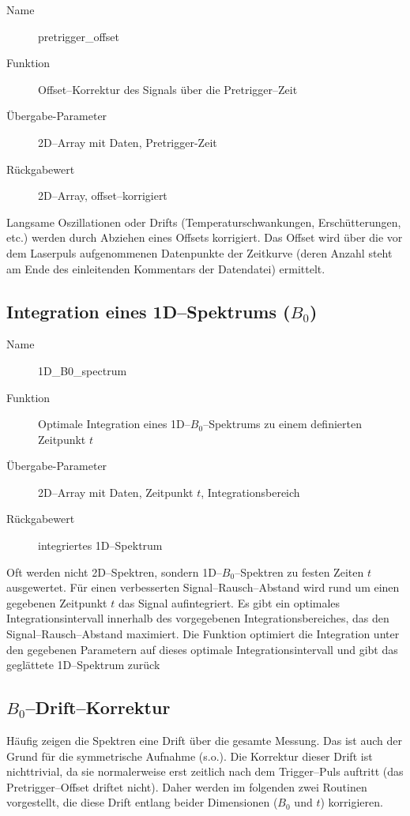 \documentclass{article}
\begin{document}
\begin{description}
  \item[Name] pretrigger\_offset
  \item[Funktion] Offset--Korrektur des Signals über die Pretrigger--Zeit
  \item[Übergabe-Parameter] 2D--Array mit Daten, Pretrigger-Zeit
  \item[Rückgabewert] 2D--Array, offset--korrigiert
\end{description}

Langsame Oszillationen oder Drifts (Temperaturschwankungen, Erschütterungen, 
etc.) werden durch Abziehen eines Offsets korrigiert. Das Offset wird über die 
vor dem Laserpuls aufgenommenen Datenpunkte der Zeitkurve (deren Anzahl steht 
am Ende des einleitenden Kommentars der Datendatei) ermittelt.


\subsection{Integration eines 1D--Spektrums ($B_0$)}

\begin{description}
  \item[Name] 1D\_B0\_spectrum
  \item[Funktion] Optimale Integration eines 1D--$B_0$--Spektrums zu einem 
  definierten Zeitpunkt $t$
  \item[Übergabe-Parameter] 2D--Array mit Daten, Zeitpunkt $t$, 
  Integrationsbereich
  \item[Rückgabewert] integriertes 1D--Spektrum
\end{description}

Oft werden nicht 2D--Spektren, sondern 1D--$B_0$--Spektren zu festen Zeiten $t$ 
ausgewertet. Für einen verbesserten Signal--Rausch--Abstand wird rund um einen 
gegebenen Zeitpunkt $t$ das Signal aufintegriert. Es gibt ein optimales 
Integrationsintervall innerhalb des vorgegebenen Integrationsbereiches, das den 
Signal--Rausch--Abstand maximiert. Die Funktion optimiert die Integration unter 
den gegebenen Parametern auf dieses optimale Integrationsintervall und gibt das 
geglättete 1D--Spektrum zurück


\subsection{$B_0$--Drift--Korrektur}

Häufig zeigen die Spektren eine Drift über die gesamte Messung. Das ist auch 
der Grund für die symmetrische Aufnahme (s.o.). Die Korrektur dieser Drift ist 
nichttrivial, da sie normalerweise erst zeitlich nach dem Trigger--Puls 
auftritt (das Pretrigger--Offset driftet nicht). Daher werden im folgenden zwei 
Routinen vorgestellt, die diese Drift entlang beider Dimensionen ($B_0$ und 
$t$) korrigieren.
\end{document}
